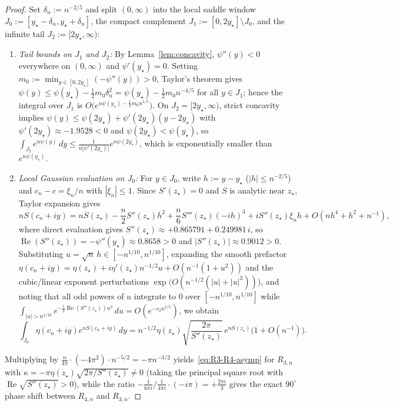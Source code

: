 \documentclass[11pt,reqno]{amsart}
\theoremstyle{definition}
\theoremstyle{remark}
\begin{document}
\begin{proof}
Set $\delta_n := n^{-2/5}$ and split $(0, \infty)$ into the local saddle window $J_0 := [y_\star - \delta_n, y_\star + \delta_n]$, the compact complement $J_1 := [0, 2y_\star] \setminus J_0$, and the infinite tail $J_2 := [2y_\star, \infty)$:
\begin{enumerate}
  \item \emph{Tail bounds on $J_1$ and $J_2$:} By Lemma~\ref{lem:concavity}, $\psi''(y) < 0$ everywhere on $(0, \infty)$ and $\psi'(y_\star) = 0$. Setting $m_0 := \min_{y \in [0, 2y_\star]} (-\psi''(y)) > 0$, Taylor's theorem gives $\psi(y) \le \psi(y_\star) - \frac{1}{2}m_0\delta_n^2 = \psi(y_\star) - \frac{1}{2}m_0 n^{-4/5}$ for all $y \in J_1$; hence the integral over $J_1$ is $O\bigl(e^{n\psi(y_\star) - \frac{1}{2}m_0 n^{1/5}}\bigr)$. On $J_2 = [2y_\star, \infty)$, strict concavity implies $\psi(y) \le \psi(2y_\star) + \psi'(2y_\star)(y - 2y_\star)$ with $\psi'(2y_\star) \approx -1.9528 < 0$ and $\psi(2y_\star) < \psi(y_\star)$, so $\int_{J_2} e^{n\psi(y)}\,dy \le \frac{1}{n|\psi'(2y_\star)|}e^{n\psi(2y_\star)}$, which is exponentially smaller than $e^{n\psi(y_\star)}$.
  \item \emph{Local Gaussian evaluation on $J_0$:} For $y \in J_0$, write $h := y - y_\star$ ($|h| \le n^{-2/5}$) and $c_n - c = \xi_n / n$ with $|\xi_n| \le 1$. Since $S'(z_\star) = 0$ and $S$ is analytic near $z_\star$, Taylor expansion gives
  \[
    n S(c_n + iy) = n S(z_\star) - \frac{n}{2} S''(z_\star) h^2 + \frac{n}{6} S'''(z_\star)(-ih)^3 + i S''(z_\star)\xi_n h + O(n h^4 + h^2 + n^{-1}),
  \]
  where direct evaluation gives $S''(z_\star) \approx +0.865791 + 0.249981\,i$, so $\operatorname{Re}(S''(z_\star)) = -\psi''(y_\star) \approx 0.8658 > 0$ and $|S''(z_\star)| \approx 0.9012 > 0$. Substituting $u = \sqrt{n}\,h \in [-n^{1/10}, n^{1/10}]$, expanding the smooth prefactor $\eta(c_n + iy) = \eta(z_\star) + i\eta'(z_\star)n^{-1/2}u + O(n^{-1}(1 + u^2))$ and the cubic/linear exponent perturbations $\exp\bigl(O(n^{-1/2}(|u| + |u|^3))\bigr)$, and noting that all odd powers of $u$ integrate to $0$ over $[-n^{1/10}, n^{1/10}]$ while $\int_{|u| > n^{1/10}} e^{-\frac{1}{2}\operatorname{Re}(S''(z_\star)) u^2}\,du = O(e^{-c_2 n^{1/5}})$, we obtain
  \[
    \int_{J_0} \eta(c_n + iy) e^{n S(c_n + iy)}\,dy
    = n^{-1/2} \eta(z_\star) \sqrt{\frac{2\pi}{S''(z_\star)}}\, e^{n S(z_\star)}\bigl(1 + O(n^{-1})\bigr).
  \]
\end{enumerate}
Multiplying by $\frac{n}{4\pi}\cdot (-4\pi^2) \cdot n^{-5/2} = -\pi n^{-3/2}$ yields~\eqref{eq:R3-R4-asymp} for $R_{3,n}$ with $\kappa = -\pi \eta(z_\star)\sqrt{2\pi / S''(z_\star)} \ne 0$ (taking the principal square root with $\operatorname{Re}\sqrt{S''(z_\star)} > 0$), while the ratio $-\frac{1}{6\pi i} / \frac{1}{4\pi i} \cdot (-i\pi) = +\frac{2\pi i}{3}$ gives the exact $90^\circ$ phase shift between $R_{4,n}$ and $R_{3,n}$.


\end{proof}
\end{document}
